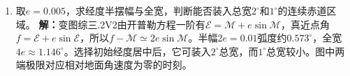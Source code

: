 \documentclass[UTF8,fontset=fandol,a4paper,11pt]{ctexart}
\begin{document}
\begin{enumerate}
\item 取$e=0.005$，求经度半摆幅与全宽，判断能否装入总宽$2^\circ$和$1^\circ$的连续赤道区域。
\textbf{解：}变图综三.2V2由开普勒方程一阶有$\mathcal E=\mathcal M+e\sin\mathcal M$，真近点角$f=\mathcal E+e\sin\mathcal E$，所以$f-\mathcal M\simeq2e\sin\mathcal M$。半幅$2e=0.01$弧度约$0.573^\circ$，全宽$4e\approx1.146^\circ$。选择初始经度居中后，它可装入$2^\circ$总宽，而$1^\circ$总宽较小。图中两端极限对应相对地面角速度为零的时刻。
\begin{center}\begin{minipage}{.98\linewidth}\centering
{}
\end{minipage}
\end{center}
\end{enumerate}
\end{document}
